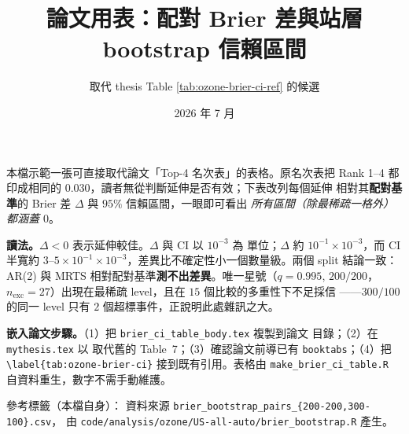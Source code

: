 \documentclass[12pt]{article}
\title{\textbf{論文用表：配對 Brier 差與站層 bootstrap 信賴區間}}
\author{取代 thesis Table \ref{tab:ozone-brier-ci-ref} 的候選}
\date{2026 年 7 月}
\begin{document}
\maketitle

本檔示範一張可直接取代論文「Top-4 名次表」的表格。原名次表把
Rank 1--4 都印成相同的 $0.030$，讀者無從判斷延伸是否有效；下表改列每個延伸
相對其\textbf{配對基準}的 Brier 差 $\Delta$ 與 $95\%$ 信賴區間，一眼即可看出
\emph{所有區間（除最稀疏一格外）都涵蓋 $0$}。

\bigskip



\bigskip
\noindent\textbf{讀法。}$\Delta<0$ 表示延伸較佳。$\Delta$ 與 CI 以 $10^{-3}$ 為
單位；$\Delta$ 約 $10^{-1}\times10^{-3}$，而 CI 半寬約 $3\text{--}5\times
10^{-1}\times10^{-3}$，差異比不確定性小一個數量級。兩個 split 結論一致：AR(2)
與 MRTS 相對配對基準\textbf{測不出差異}。唯一星號（$q{=}0.995$, $200/200$，
$n_{\mathrm{exc}}{=}27$）出現在最稀疏 level，且在 $15$ 個比較的多重性下不足採信
——$300/100$ 的同一 level 只有 $2$ 個超標事件，正說明此處雜訊之大。

\medskip
\noindent\textbf{嵌入論文步驟。}（1）把 \verb|brier_ci_table_body.tex| 複製到論文
目錄；（2）在 \verb|mythesis.tex| 以 \verb|| 取代舊的
Table~7；（3）確認論文前導已有 \verb|booktabs|；（4）把
\verb|\label{tab:ozone-brier-ci}| 接到既有引用。表格由
\verb|make_brier_ci_table.R| 自資料重生，數字不需手動維護。

\vfill
\footnotesize
\noindent 參考標籤（本檔自身）：\label{tab:ozone-brier-ci-ref}
資料來源 \verb|brier_bootstrap_pairs_{200-200,300-100}.csv|，
由 \verb|code/analysis/ozone/US-all-auto/brier_bootstrap.R| 產生。
\end{document}
